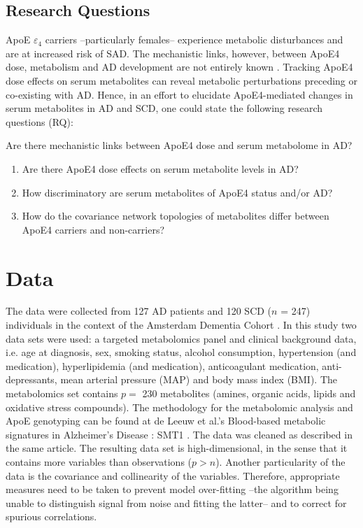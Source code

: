 \documentclass{amsart}
\theoremstyle{plain}
\begin{document}
\newpage
\subsection{Research Questions}
ApoE $\varepsilon_4$ carriers --particularly females-- experience metabolic disturbances and are at increased risk of SAD. The mechanistic links, however, between ApoE4 dose, metabolism and AD development are not entirely known \cite{Fernandez-Calle2022APOEDiseases}. Tracking ApoE4 dose effects on serum metabolites can reveal metabolic perturbations preceding or co-existing with AD. Hence, in an effort to elucidate ApoE4-mediated changes in serum metabolites in AD and SCD, one could state the following research questions (RQ):

Are there mechanistic links between ApoE4 dose and serum metabolome in AD?
\begin{enumerate}
    \item Are there ApoE4 dose effects on serum metabolite levels in AD?
    \item How discriminatory are serum metabolites of ApoE4 status and/or AD?
    \item How do the covariance network topologies of metabolites differ between ApoE4 carriers and non-carriers?
\end{enumerate}
\clearpage
\section{Data}
The data were collected from 127 AD patients and 120 SCD ($n$ = 247) individuals in the context of the Amsterdam Dementia Cohort \cite{VanDerFlier2018AmsterdamCare, deLeeuw2017Blood-basedDisease}. In this study two data sets were used: a targeted metabolomics panel and clinical background data, i.e. age at diagnosis, sex, smoking status, alcohol consumption, hypertension (and medication), hyperlipidemia (and medication), anticoagulant medication, anti-depressants, mean arterial pressure (MAP) and body mass index (BMI). The metabolomics set contains $p =$ 230 metabolites (amines, organic acids, lipids and oxidative stress compounds). The methodology for the metabolomic analysis and ApoE genotyping can be found at de Leeuw et al.'s  Blood-based metabolic signatures in Alzheimer's Disease \cite{deLeeuw2017Blood-basedDisease}: SMT1 . The data was cleaned as described in the same article. The resulting data set is high-dimensional, in the sense that it contains more variables than observations ($p > n$). Another particularity of the data is the covariance and collinearity of the variables. Therefore, appropriate measures need to be taken to prevent model over-fitting --the algorithm being unable to distinguish signal from noise and fitting the latter--  and to correct for spurious correlations.
\newpage
\end{document}
